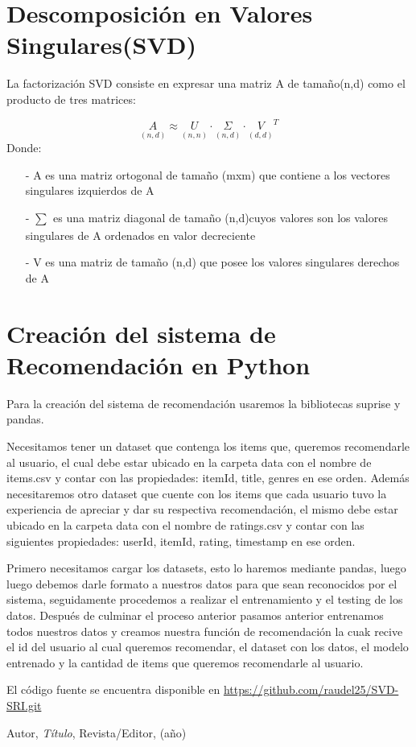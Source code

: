 \documentclass{article}
\begin{document}
\section{Descomposición en Valores Singulares(SVD)}

La factorización SVD consiste en expresar una matriz A de tamaño(n,d) como el producto de tres matrices:

$$ \underset{(n, d)}A \approx \underset{(n, n)}U \cdot \underset{(n, d)}\Sigma \cdot \underset{(d, d)} V^T  $$
Donde:
\begin{enumerate}
	\item[-] A es una matriz ortogonal de tamaño (mxm) que contiene a los vectores singulares izquierdos de A
	\item[-] $\sum_{}^{}$ es una matriz diagonal de tamaño (n,d)cuyos valores son los valores singulares de A ordenados en valor decreciente
	\item[-] V es una matriz de tamaño (n,d) que posee los valores singulares derechos de A
\end{enumerate}

\section{Creación del sistema de Recomendación en Python}

Para la creación del sistema de recomendación usaremos la bibliotecas suprise y pandas.

Necesitamos tener un dataset que contenga los items que, queremos recomendarle al usuario, el cual debe estar ubicado en la carpeta data con el nombre de items.csv y contar con las propiedades: itemId, title, genres en ese orden. Además necesitaremos otro dataset que cuente con los items que cada usuario tuvo la experiencia de apreciar y dar su respectiva recomendación, el mismo debe estar ubicado en la carpeta data con el nombre de ratings.csv y contar con las siguientes propiedades:
userId, itemId, rating, timestamp en ese orden.

Primero necesitamos cargar los datasets, esto lo haremos mediante pandas, luego luego debemos darle formato a nuestros datos para que sean reconocidos por el sistema, seguidamente procedemos a realizar el entrenamiento y el testing de los datos. Después de culminar el proceso anterior pasamos anterior entrenamos todos nuestros datos y creamos nuestra función de recomendación la cuak recive el id del usuario al cual queremos recomendar, el dataset con los datos, el modelo entrenado y la cantidad de items que queremos recomendarle al usuario.

El código fuente se encuentra disponible en \url{https://github.com/raudel25/SVD-SRI.git}




  

\begin{thebibliography}{99}

 Autor, \emph{Título}, Revista/Editor, (año)

\end{thebibliography}
\end{document}
